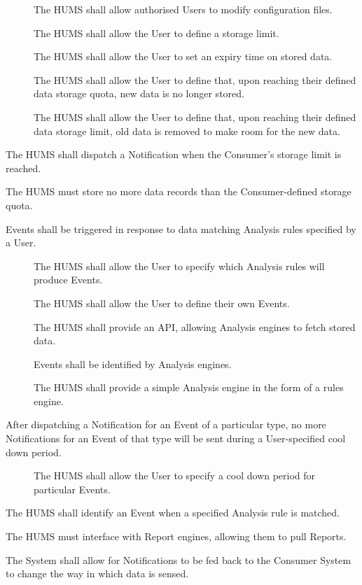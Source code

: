 \begin{description}
\begin{description}
	  	\item[] The HUMS shall allow authorised Users to modify
 		configuration files. 
		 \item[] The HUMS shall allow the User to define a 	
			storage limit.
		  \item[] The HUMS shall allow the User to set an 
			expiry time on stored data.
		  \item[] The HUMS shall allow the User to define that, 
			upon reaching their defined data storage quota, new data is 
			no longer stored.
		 \item[] The HUMS shall allow the User to define that, 
			upon reaching their defined data storage limit, old data is 
			removed to make room for the new data.
	\end{description}
	 \item[\fr{5}] The HUMS shall dispatch a Notification when the Consumer's 
		storage limit is reached.
	  \item[\fr{6}] The HUMS must store no more data records than the 	
		Consumer-defined storage quota.
	\item[\fr{7}] Events shall be triggered in response to data matching Analysis 
	rules specified by a User.
		  \begin{description}
			 \item[]  The HUMS shall allow the User to specify 	
			which Analysis rules will produce Events.
			 \item[] The HUMS shall allow the User to define their
 			own Events.
 			\item[] The HUMS shall provide an API, 			
			allowing Analysis engines to fetch stored data.
			\item[] Events shall be identified by Analysis engines.
 			\item[] The HUMS shall provide a simple Analysis 	
			engine in the form of a rules engine.
	\end{description}
	
	\item[\fr{8}] After dispatching a Notification for an Event of a particular 
		type, no more Notifications for an Event of that type will be 	
		sent during a User-specified cool down period.
		  \begin{description}
			\item[] The HUMS shall allow the User to specify a cool down period for particular Events.
			  \end{description}
	\item[\fr{9}] The HUMS shall identify an Event when a specified Analysis 
		rule is matched.
	\item[\fr{10}] The HUMS must interface with Report engines, allowing 
		them to pull Reports.
	\item[\fr{11}] The System shall allow for Notifications to be fed back to the
		Consumer System to change the way in which data is sensed.
\end{description}

